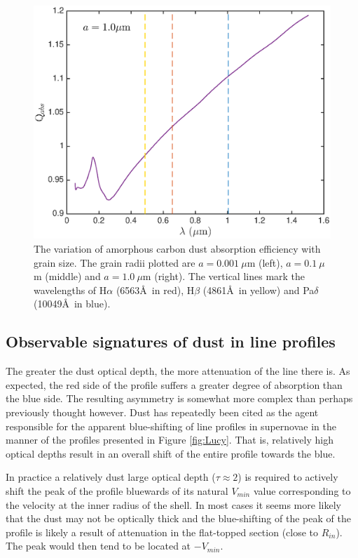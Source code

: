\documentclass[useAMS,usenatbib,usegraphicx]{mnras}
\begin{document}
\begin{figure}
\includegraphics[trim =48 10 45 15,clip=true,scale=0.35]{Qabs_a1_0}
\caption{The variation of amorphous carbon dust absorption efficiency with grain size. The grain radii plotted are $a=0.001~\mu$m (left), $a=0.1~\mu$m (middle) and $a=1.0~\mu$m (right).  The vertical lines mark the wavelengths of H$\alpha$ (6563\AA\ in red), H$\beta$ (4861\AA\ in yellow) and Pa$\delta$ (10049\AA\ in blue).}
\label{wav_dep2}
\end{figure}






\subsection{Observable signatures of dust in line profiles}
\label{asym}

The greater the dust optical depth, the more attenuation of the line 
there is.  As expected, the red side of the profile suffers a greater 
degree of absorption than the blue side.  The resulting asymmetry is 
somewhat more complex than perhaps previously thought however.  Dust has 
repeatedly been cited as the agent responsible for the apparent 
blue-shifting of line profiles in supernovae in the manner of the profiles 
presented in Figure \ref{fig:Lucy}.  That is, relatively high optical 
depths result in an overall shift of the entire profile towards the blue.

In practice a relatively dust large optical depth ($\tau \approx 2$) is 
required to actively shift the peak of the profile bluewards of its natural 
$V_{min}$ value corresponding to the velocity at the inner radius of the shell.  In most cases it seems more likely that the dust
may not be optically thick and the blue-shifting of the peak of the profile is 
likely a result of attenuation in the flat-topped section (close to 
$R_{in}$).  The peak would then tend to be located at $-V_{min}$.
\end{document}
